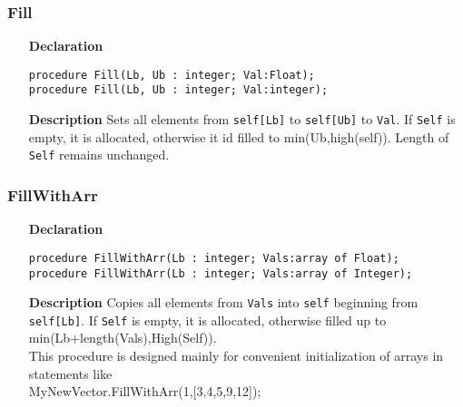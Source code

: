 \documentclass[12pt,a4paper,oneside]{report}
\newcommand{\declarationitem}[1]{\textbf{#1}}
\newcommand{\descriptiontitle}[1]{\textbf{#1}}
\newcommand{\code}[1]{\texttt{#1}}
\begin{document}
\subsubsection{Fill}
\begin{itemize}
	\item[\declarationitem{Declaration}\hfill]
	\begin{flushleft}
		     \code{procedure Fill(Lb, Ub : integer; Val:Float);}\\ \vspace{4pt}
		     \code{procedure Fill(Lb, Ub : integer; Val:integer);}
	\end{flushleft}
	\item[\descriptiontitle{Description}\hfill]
	Sets all elements from \code{self[Lb]} to \code{self[Ub]} to \code{Val}. If \code{Self} is empty, it is allocated, otherwise it id filled to min(Ub,high(self)). Length of \code{Self} remains unchanged.
\end{itemize}
\subsubsection{FillWithArr}
\begin{itemize}
	\item[\declarationitem{Declaration}\hfill]
	\begin{flushleft}
		\code{procedure FillWithArr(Lb : integer; Vals:array of Float);}\\ \vspace{4pt}
		\code{procedure FillWithArr(Lb : integer; Vals:array of Integer);}
	\end{flushleft}
	\item[\descriptiontitle{Description}\hfill]
	Copies all elements from \code{Vals} into \code{self} beginning from \code{self[Lb]}. If \code{Self} is empty, it is allocated, otherwise filled up to \\ min(Lb+length(Vals),High(Self)). \\ This procedure is designed mainly for convenient initialization of arrays in statements like \\ 
	MyNewVector.FillWithArr(1,[3,4,5,9,12]);
\end{itemize}
\end{document}
